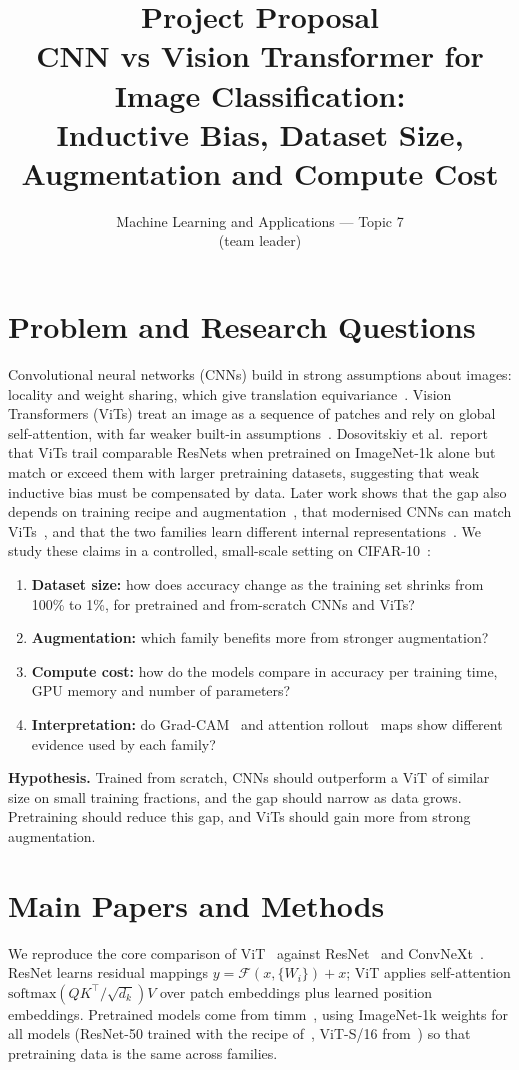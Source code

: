\documentclass[10pt,a4paper]{article}
\title{\vspace{-1.6cm}\textbf{Project Proposal}\\[2pt]
\large CNN vs Vision Transformer for Image Classification:\\
Inductive Bias, Dataset Size, Augmentation and Compute Cost}
\author{Machine Learning and Applications --- Topic 7\\
[Member 1 name, student ID] (team leader)\quad [Member 2 name, student ID]}
\date{}
\begin{document}
\maketitle
\vspace{-1.2cm}

\section{Problem and Research Questions}
Convolutional neural networks (CNNs) build in strong assumptions about images: locality and
weight sharing, which give translation equivariance~\cite{he2016resnet}. Vision Transformers
(ViTs) treat an image as a sequence of patches and rely on global self-attention, with far weaker
built-in assumptions~\cite{dosovitskiy2021vit}. Dosovitskiy et al.\ report that ViTs trail
comparable ResNets when pretrained on ImageNet-1k alone but match or exceed them with larger
pretraining datasets, suggesting that weak inductive bias must be compensated by data.
Later work shows that the gap also depends on training recipe and augmentation~\cite{touvron2021deit,
steiner2022howtotrain}, that modernised CNNs can match ViTs~\cite{liu2022convnext}, and that the
two families learn different internal representations~\cite{raghu2021vitsee}.
We study these claims in a controlled, small-scale setting on CIFAR-10~\cite{krizhevsky2009cifar}:
\begin{enumerate}
  \item[\textbf{RQ1}] \textbf{Dataset size:} how does accuracy change as the training set shrinks
  from 100\% to 1\%, for pretrained and from-scratch CNNs and ViTs?
  \item[\textbf{RQ2}] \textbf{Augmentation:} which family benefits more from stronger augmentation?
  \item[\textbf{RQ3}] \textbf{Compute cost:} how do the models compare in accuracy per training
  time, GPU memory and number of parameters?
  \item[\textbf{RQ4}] \textbf{Interpretation:} do Grad-CAM~\cite{selvaraju2017gradcam} and attention
  rollout~\cite{abnar2020rollout} maps show different evidence used by each family?
\end{enumerate}
\textbf{Hypothesis.} Trained from scratch, CNNs should outperform a ViT of similar size on small
training fractions, and the gap should narrow as data grows. Pretraining should reduce this gap,
and ViTs should gain more from strong augmentation.

\section{Main Papers and Methods}
We reproduce the core comparison of ViT~\cite{dosovitskiy2021vit} against ResNet~\cite{he2016resnet}
and ConvNeXt~\cite{liu2022convnext}. ResNet learns residual mappings
$y = \mathcal{F}(x,\{W_i\}) + x$; ViT applies self-attention
$\mathrm{softmax}(QK^\top/\sqrt{d_k})V$ over patch embeddings plus learned position embeddings.
Pretrained models come from timm~\cite{wightman2019timm}, using ImageNet-1k weights for all models
(ResNet-50 trained with the recipe of~\cite{wightman2021resnetstrikes}, ViT-S/16
from~\cite{steiner2022howtotrain}) so that pretraining data is the same across families.
\end{document}
